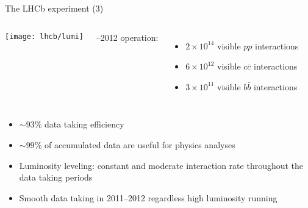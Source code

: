 \begin{frame}[t]{The LHCb experiment (3)}

\begin{columns}[t]

\texttt{[image: lhcb/lumi]}

\begin{minipage}[c][.4\textheight][t]{\linewidth}
--2012 operation:
\bigskip
\begin{itemize}
\item $2\times10^{14}$ visible $pp$ interactions 
\item $6\times10^{12}$ visible $c\bar{c}$ interactions 
\item $3\times10^{11}$ visible $b\bar{b}$ interactions 
\end{itemize}
\end{minipage}
\end{columns}

\begin{itemize}
\item ${\sim}93\%$ data taking efficiency
\item ${\sim}99\%$ of accumulated data are useful for physics analyses
\item Luminosity leveling: constant and moderate interaction rate throughout the data taking periods
\item Smooth data taking in 2011--2012 regardless high luminosity running 
\end{itemize}

\end{frame}